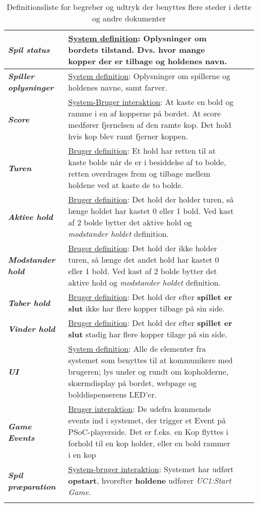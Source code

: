 \documentclass[Kravspecifikation/Kravspec_Main.tex]{subfiles}
\begin{document}
\begin{longtable}{|>{\centering\arraybackslash}m{3cm}|>{\RaggedRight\arraybackslash}m{10cm}| p{} | p{}|}
        \hline
        \textit{\textbf{Spil status}} & \underline{System definition}:
        Oplysninger om bordets tilstand. Dvs. hvor mange kopper der er tilbage og holdenes navn. \\
        \hline
        \textit{\textbf{Spiller oplysninger}} & \underline{System definition}:
        Oplysninger om spillerne og holdenes navne, samt farver. \\
        \hline
        \textit{\textbf{Score}} & \underline{System-Bruger interaktion}:
        At kaste en bold og ramme i en af kopperne på bordet. At score medfører fjernelsen af den ramte kop. Det hold hvis kop blev ramt fjerner koppen. \\
        \hline
        \textit{\textbf{Turen}} & \underline{Bruger definition}:
        Et hold har retten til at kaste bolde når de er i besiddelse af to bolde, retten overdrages frem og tilbage mellem holdene ved at kaste de to bolde. \\
        \hline
        \textit{\textbf{Aktive hold}} & \underline{Bruger definition}:
        Det hold der holder turen, så længe holdet har kastet 0 eller 1 bold. Ved kast af 2 bolde bytter det aktive hold og \textit{modstander holdet} definition.\\
        \hline
        \textit{\textbf{Modstander hold}} & \underline{Bruger definition}:
        Det hold der ikke holder turen, så længe det andet hold har kastet 0 eller 1 bold. Ved kast af 2 bolde bytter det aktive hold og \textit{modstander holdet} definition.\\
        \hline
        \textit{\textbf{Taber hold}} & \underline{Bruger definition}:
        Det hold der efter \textbf{spillet er slut} ikke har flere kopper tilbage på sin side.\\
        \hline
        \textit{\textbf{Vinder hold}} & \underline{Bruger definition}:
        Det hold der efter \textbf{spillet er slut} stadig har flere kopper tilage på sin side.\\
        \hline
        \textit{\textbf{UI}} & \underline{System definition}:
        Alle de elementer fra systemet som benyttes til at kommunikere med brugeren; lys under og rundt om kopholderne, skærmdisplay på bordet, webpage og bolddispenserens LED'er.\\
        \hline
        \textit{\textbf{Game Events}} & \underline{Bruger interaktion}:
        De udefra kommende events ind i systemet, der trigger et Event på PSoC-playerside. Det er f.eks. en Kop flyttes i forhold til en kop holder, eller en bold rammer i en kop\\
        \hline
        \textit{\textbf{Spil præparation}} & \underline{System-bruger interaktion}:
        Systemet har udført \textbf{opstart}, hvorefter \textbf{holdene} udfører \textit{UC1:Start Game}. \\
        \hline
        
    \caption{Definitionsliste for begreber og udtryk der benyttes flere steder i dette og andre dokumenter}
    \label{tab:def_liste}
    \end{longtable}
\end{document}
